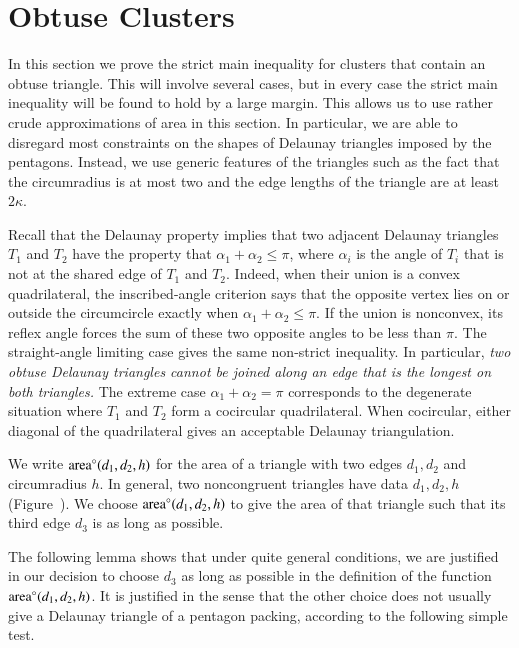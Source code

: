 \section{Obtuse Clusters}

In this section we prove the strict main inequality for clusters that
contain an obtuse triangle.  This will involve several cases, but in
every case the strict main inequality will be found to hold by a large
margin.  This allows us to use rather crude approximations of
area in this section.  In particular, we are able to disregard most
constraints on the shapes of Delaunay triangles imposed by the
pentagons.  Instead, we use generic features of the triangles such as
the fact that the circumradius is at most two and the edge lengths of
the triangle are at least $2\kappa$.

\begin{remark}
  Recall that the Delaunay property implies that two adjacent Delaunay
  triangles $T_1$ and $T_2$ have the property that $\alpha_1 +
  \alpha_2\le \pi$, where $\alpha_i$ is the angle of $T_i$ that is not
  at the shared edge of $T_1$ and $T_2$.  Indeed, when their union
  is a convex quadrilateral, the inscribed-angle criterion says that
  the opposite vertex lies on or outside the circumcircle exactly
  when $\alpha_1+\alpha_2\le\pi$.  If the union is nonconvex,
  its reflex angle forces the sum of these two opposite angles to be
  less than $\pi$.  The straight-angle limiting case gives the same
  non-strict inequality.  In particular, {\it two
    obtuse Delaunay triangles cannot be joined along an edge that is
    the longest on both triangles.}  The extreme case
  $\alpha_1+\alpha_2=\pi$ corresponds to the degenerate situation
  where $T_1$ and $T_2$ form a cocircular quadrilateral. When
  cocircular, either diagonal of the quadrilateral gives an acceptable
  Delaunay triangulation.
\end{remark}

We write ${\operatorname{area}}^\circ(d_1,d_2,h)$ for the area of a triangle with two edges
$d_1,d_2$ and circumradius $h$.  In general, two noncongruent
triangles have data $d_1,d_2,h$ (Figure~).  We choose ${\operatorname{area}}^\circ(d_1,d_2,h)$ to
give the area of that triangle such that its third edge $d_3$ is as
long as possible.

The following lemma shows that under quite general
conditions, we are justified in our decision to choose $d_3$ as long
as possible in the definition of the function ${\operatorname{area}}^\circ(d_1,d_2,h)$.  It
is justified in the sense that the other choice does not usually give
a Delaunay triangle of a pentagon packing, according to the following
simple test.

